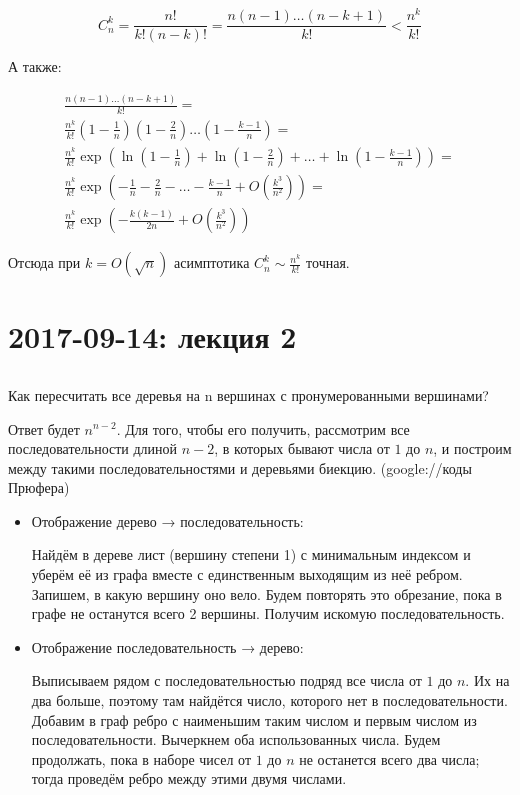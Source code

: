 \documentclass[12pt]{article}
\begin{document}
\[ C^k_n = \frac {n!} {k! (n-k)!} = \frac {n (n-1) \ldots (n - k + 1)} {k!}  < \frac {n^k} {k!} \]

А также:

\begin{multline*}
\frac {n (n-1) \ldots (n - k + 1)} {k!} = \\
\frac {n^k} {k!} \left(1 - \frac 1 n \right) \left(1 - \frac 2 n \right) \ldots \left(1 - \frac {k-1} n \right) = \\
\frac {n^k} {k!} \exp \left( \ln\left(1 - \frac 1 n \right) + \ln \left(1 - \frac 2 n \right) + \ldots + \ln \left(1 - \frac {k-1} n \right) \right) = \\
\frac {n^k} {k!} \exp \left( - \frac 1 n - \frac 2 n - \ldots - \frac {k-1} n + O\left(\frac {k^3} {n^2}\right) \right) = \\
\frac {n^k} {k!} \exp \left( - \frac {k (k-1)} {2n} + O \left(\frac {k^3} {n^2} \right) \right)
\end{multline*}

Отсюда при $k = O(\sqrt{n})$ асимптотика $C^k_n \sim \frac {n^k} {k!}$ точная.

\section{2017-09-14: лекция 2}

\subsection{}

Как пересчитать все деревья на n вершинах с пронумерованными вершинами?

Ответ будет $n^{n-2}$. Для того, чтобы его получить, рассмотрим все последовательности длиной $n-2$, в которых бывают числа от $1$ до $n$, и построим между такими последовательностями и деревьями биекцию. (google://коды Прюфера)

\begin{itemize}
\item Отображение дерево → последовательность:

Найдём в дереве лист (вершину степени 1) с минимальным индексом и уберём её из графа вместе с единственным выходящим из неё ребром. Запишем, в какую вершину оно вело. Будем повторять это обрезание, пока в графе не останутся всего 2 вершины. Получим искомую последовательность.

\item Отображение последовательность → дерево:

Выписываем рядом с последовательностью подряд все числа от $1$ до $n$. Их на два больше, поэтому там найдётся число, которого нет в последовательности. Добавим в граф ребро с наименьшим таким числом и первым числом из последовательности. Вычеркнем оба использованных числа. Будем продолжать, пока в наборе чисел от $1$ до $n$ не останется всего два числа; тогда проведём ребро между этими двумя числами.
\end{itemize}
\end{document}
